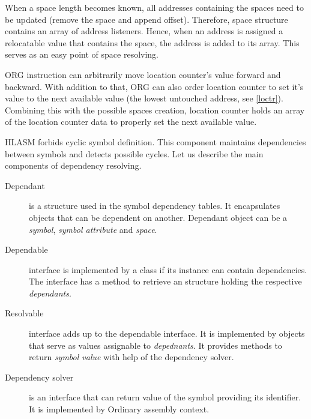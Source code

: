 When a space length becomes known, all addresses containing the spaces need to be updated (remove the space and append offset). Therefore, space structure contains an array of address listeners. Hence, when an address is assigned a relocatable value that contains the space, the address is added to its array. This serves as an easy point of space resolving.

\vspace{0.5cm}

ORG instruction can arbitrarily move location counter's value forward and backward. With addition to that, ORG can also order location counter to set it's value to the next available value (the lowest untouched address, see \cref{loctr}). Combining this with the possible spaces creation, location counter holds an array of the location counter data to properly set the next available value.

\label{symbol_dependency_tables}
HLASM forbids cyclic symbol definition. This component maintains dependencies between symbols and detects possible cycles.
Let us describe the main components of dependency resolving.

\begin{description}
	\item[Dependant] is a structure used in the symbol dependency tables. It encapsulates objects that can be dependent on another. Dependant object can be a \emph{symbol}, \emph{symbol attribute} and \emph{space}.
	\item[Dependable] interface is implemented by a class if its instance can contain dependencies. The interface has a method to retrieve an structure holding the respective \emph{dependants}. 
	\item[Resolvable] interface adds up to the dependable interface. It is implemented by objects that serve as values assignable to \emph{depednants}. It provides methods to return \emph{symbol value} with help of the dependency solver. 
	\item[Dependency solver] is an interface that can return value of the symbol providing its identifier. It is implemented by Ordinary assembly context.
\end{description}

\vspace{0.5cm}

